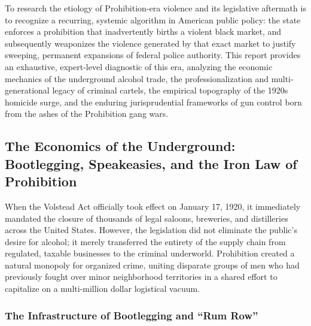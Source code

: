 \documentclass[
]{article}
\begin{document}
To research the etiology of Prohibition-era violence and its legislative
aftermath is to recognize a recurring, systemic algorithm in American
public policy: the state enforces a prohibition that inadvertently
births a violent black market, and subsequently weaponizes the violence
generated by that exact market to justify sweeping, permanent expansions
of federal police authority. This report provides an exhaustive,
expert-level diagnostic of this era, analyzing the economic mechanics of
the underground alcohol trade, the professionalization and
multi-generational legacy of criminal cartels, the empirical topography
of the 1920s homicide surge, and the enduring jurisprudential frameworks
of gun control born from the ashes of the Prohibition gang wars.

\subsection{\texorpdfstring{\textbf{The Economics of the Underground:
Bootlegging, Speakeasies, and the Iron Law of
Prohibition}}{The Economics of the Underground: Bootlegging, Speakeasies, and the Iron Law of Prohibition}}\label{the-economics-of-the-underground-bootlegging-speakeasies-and-the-iron-law-of-prohibition}

When the Volstead Act officially took effect on January 17, 1920, it
immediately mandated the closure of thousands of legal saloons,
breweries, and distilleries across the United States. However, the
legislation did not eliminate the public's desire for alcohol; it merely
transferred the entirety of the supply chain from regulated, taxable
businesses to the criminal underworld. Prohibition created a natural
monopoly for organized crime, uniting disparate groups of men who had
previously fought over minor neighborhood territories in a shared effort
to capitalize on a multi-million dollar logistical vacuum.

\subsubsection{\texorpdfstring{\textbf{The Infrastructure of Bootlegging
and ``Rum
Row''}}{The Infrastructure of Bootlegging and ``Rum Row''}}\label{the-infrastructure-of-bootlegging-and-rum-row}
\end{document}
